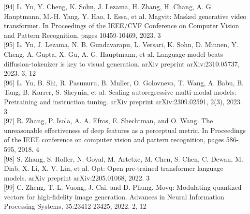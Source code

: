 \documentclass{article}
\begin{document}
[94] L. Yu, Y. Cheng, K. Sohn, J. Lezama, H. Zhang, H. Chang, A. G. Hauptmann, M.-H. Yang, Y. Hao, I. Essa, et al. Magvit: Masked generative video transformer. In Proceedings of the IEEE/CVF Conference on Computer Vision and Pattern Recognition, pages 10459-10469, 2023. 3\\[0pt]
[95] L. Yu, J. Lezama, N. B. Gundavarapu, L. Versari, K. Sohn, D. Minnen, Y. Cheng, A. Gupta, X. Gu, A. G. Hauptmann, et al. Language model beats diffusion-tokenizer is key to visual generation. arXiv preprint arXiv:2310.05737, 2023. 3, 12\\[0pt]
[96] L. Yu, B. Shi, R. Pasunuru, B. Muller, O. Golovneva, T. Wang, A. Babu, B. Tang, B. Karrer, S. Sheynin, et al. Scaling autoregressive multi-modal models: Pretraining and instruction tuning. arXiv preprint arXiv:2309.02591, 2(3), 2023. 3\\[0pt]
[97] R. Zhang, P. Isola, A. A. Efros, E. Shechtman, and O. Wang. The unreasonable effectiveness of deep features as a perceptual metric. In Proceedings of the IEEE conference on computer vision and pattern recognition, pages 586-595, 2018. 4\\[0pt]
[98] S. Zhang, S. Roller, N. Goyal, M. Artetxe, M. Chen, S. Chen, C. Dewan, M. Diab, X. Li, X. V. Lin, et al. Opt: Open pre-trained transformer language models. arXiv preprint arXiv:2205.01068, 2022. 3\\[0pt]
[99] C. Zheng, T.-L. Vuong, J. Cai, and D. Phung. Movq: Modulating quantized vectors for high-fidelity image generation. Advances in Neural Information Processing Systems, 35:23412-23425, 2022. 2, 12
\end{document}
